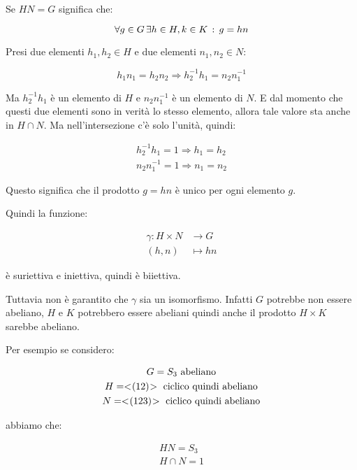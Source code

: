 \begin{soluzione}
	Se $HN = G$ significa che:
	
	\begin{equation}
		\forall g \in G \, \exists h \in H, k \in K \,:\, g = hn
	\end{equation}

	Presi due elementi $h_1, h_2 \in H$ e due elementi $n_1, n_2 \in N$:
	
	\begin{equation}
		h_1n_1 = h_2n_2 \Longrightarrow h_2^{-1}h_1 = n_2n_1^{-1}
	\end{equation}

	Ma $h_2^{-1}h_1$ è un elemento di $H$ e $n_2n_1^{-1}$ è un elemento di $N$. E dal momento che questi due elementi sono in verità lo stesso elemento, allora tale valore sta anche in $H \cap N$. Ma nell'intersezione c'è solo l'unità, quindi:
	
	\begin{gather}
		h_2^{-1}h_1 = 1 \Longrightarrow h_1 = h_2 \\
		n_2n_1^{-1} = 1 \Longrightarrow n_1 = n_2 
	\end{gather}

	Questo significa che il prodotto $g = hn$ è unico per ogni elemento $g$.
	
	Quindi la funzione:
	
	\begin{align}
		\gamma: H \times N &\longrightarrow G \\
		(h, n) &\longmapsto hn
	\end{align}

	è suriettiva e iniettiva, quindi è biiettiva.
	
	Tuttavia non è garantito che $\gamma$ sia un isomorfismo. Infatti $G$ potrebbe non essere abeliano, $H$ e $K$ potrebbero essere abeliani quindi anche il prodotto $H \times K$ sarebbe abeliano.
	
	Per esempio se considero:
	
	\begin{gather}
		G = S_3 \text{ abeliano} \\
		H = < \negmedspace (12) \negmedspace > \text{ ciclico quindi abeliano} \\
		N = < \negmedspace (123) \negmedspace > \text{ ciclico quindi abeliano}
	\end{gather}

	abbiamo che:
	
	\begin{gather}
		HN = S_3 \\
		H \cap N = 1
	\end{gather}


\end{soluzione}
